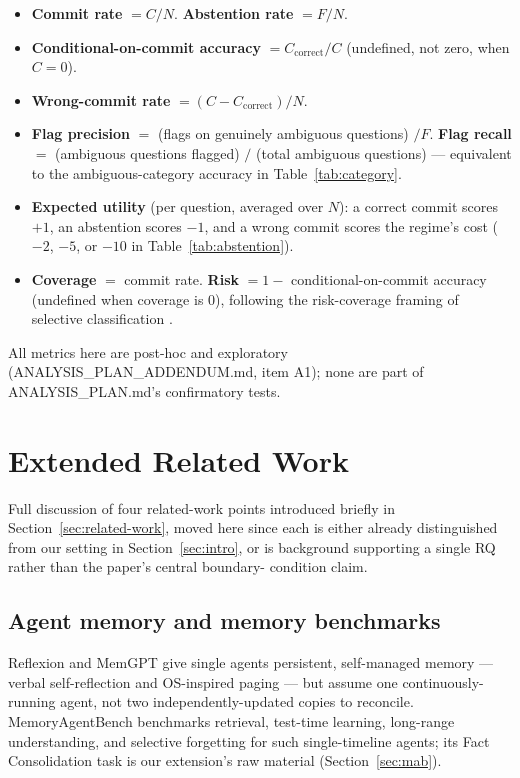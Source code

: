 \documentclass[11pt]{article}
\begin{document}
\begin{itemize}[itemsep=1pt,topsep=2pt,leftmargin=*]
  \item \textbf{Commit rate} $= C / N$. \textbf{Abstention rate} $= F / N$.
  \item \textbf{Conditional-on-commit accuracy} $= C_{\text{correct}} / C$
  (undefined, not zero, when $C{=}0$).
  \item \textbf{Wrong-commit rate} $= (C - C_{\text{correct}}) / N$.
  \item \textbf{Flag precision} $=$ (flags on genuinely ambiguous questions)
  $/ F$. \textbf{Flag recall} $=$ (ambiguous questions flagged) $/$ (total
  ambiguous questions) --- equivalent to the ambiguous-category accuracy in
  Table~\ref{tab:category}.
  \item \textbf{Expected utility} (per question, averaged over $N$): a
  correct commit scores $+1$, an abstention scores $-1$, and a wrong commit
  scores the regime's cost ($-2$, $-5$, or $-10$ in Table~\ref{tab:abstention}).
  \item \textbf{Coverage} $=$ commit rate. \textbf{Risk} $= 1 -$
  conditional-on-commit accuracy (undefined when coverage is $0$), following
  the risk-coverage framing of selective classification
  \citep{elyaniv2010selective,geifman2017selective}.
\end{itemize}

All metrics here are post-hoc and exploratory (ANALYSIS\_PLAN\_ADDENDUM.md,
item A1); none are part of ANALYSIS\_PLAN.md's confirmatory tests.

\section{Extended Related Work}
\label{sec:related-work-extended}

Full discussion of four related-work points introduced briefly in
Section~\ref{sec:related-work}, moved here since each is either already
distinguished from our setting in Section~\ref{sec:intro}, or is
background supporting a single RQ rather than the paper's central boundary-
condition claim.

\subsection{Agent memory and memory benchmarks}
Reflexion \citep{shinn2023reflexion} and MemGPT \citep{packer2023memgpt}
give single agents persistent, self-managed memory --- verbal
self-reflection and OS-inspired paging --- but assume one continuously-
running agent, not two independently-updated copies to reconcile.
MemoryAgentBench \citep{hu2025memoryagentbench} benchmarks retrieval,
test-time learning, long-range understanding, and selective forgetting for
such single-timeline agents; its Fact Consolidation task is our extension's
raw material (Section~\ref{sec:mab}).
\end{document}
